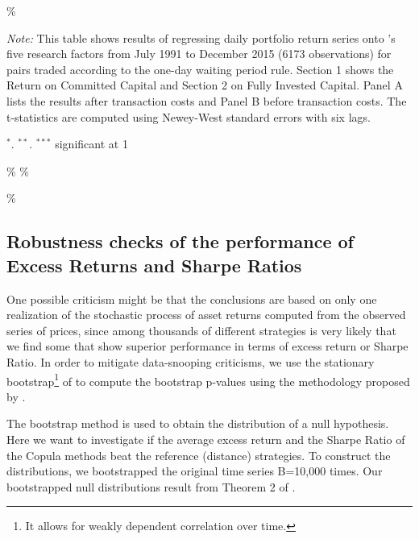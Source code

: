 \documentclass[a4paper]{article}
\begin{document}
\begin{sidewaystable}
\begin{threeparttable}[H]
\begin{tabularx}{\textwidth}{@{\extracolsep{\fill}}lllllllllllllll@{}}
			\bottomrule
		\end{tabularx}\%
		\begin{tablenotes}
			\item \textit{Note:} \scriptsize  This table shows results of regressing daily portfolio return series onto \citet*{ff15}'s five research factors from July 1991 to December 2015 (6173 observations) for pairs traded according to the one-day waiting period rule. Section 1 shows the Return on Committed Capital and Section 2 on Fully Invested Capital. Panel A lists the results after transaction costs and Panel B before transaction costs. The t-statistics are computed using Newey-West standard errors with six lags.
			\item \scriptsize $^{\ast}$. $^{\ast\ast}$. $^{\ast\ast\ast}$  significant at 1\\%
		\end{tablenotes}
	\end{threeparttable}\%
	\label{tab:table119}\%
\end{sidewaystable}\%

\newpage
	
	\subsection{Robustness checks of the performance of Excess Returns and Sharpe Ratios}
	
	One possible criticism might be that the conclusions are based on only one realization of the stochastic process of asset returns computed from the observed series of prices, since among thousands of different strategies is very likely that we find some that show superior performance in terms of excess return or Sharpe Ratio. In order to mitigate data-snooping criticisms, we use the stationary bootstrap\footnote{It allows for weakly dependent correlation over time.} of \citet*{pr94} to compute the bootstrap p-values using the methodology proposed by \citet*{lw08}.
	
	The bootstrap method is used to obtain the distribution of a null hypothesis. Here we want to investigate if the average excess return and the Sharpe Ratio of the Copula methods beat the reference (distance) strategies. To construct the distributions, we bootstrapped the original time series B=10,000 times. Our bootstrapped null distributions result from Theorem 2 of \citet*{pr94}.
	
\end{document}
